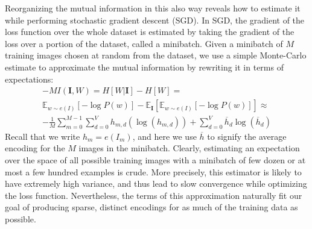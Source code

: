 Reorganizing the mutual information in this also way reveals how to estimate it while performing stochastic gradient descent (SGD). In SGD, the gradient of the loss function over the whole dataset is estimated by taking the gradient of the loss over a portion of the dataset, called a minibatch. Given a minibatch of $M$ training images chosen at random from the dataset, we use a simple Monte-Carlo estimate to approximate the mutual information by rewriting it in terms of expectations:
\begin{equation}
\begin{split}
    -MI\left(\mathbf{I}, W\right) = H[W | \mathbf{I}] - H[W] = \\
    \mathbb{E}_{w \sim e(I)}\left[ -\log P(w) \right] - \mathbb{E}_\mathbf{I}\left[ \mathbb{E}_{w \sim e(I)}\left[ -\log P(w) \right] \right] \approx \\
    -\frac{1}{M} \sum_{m=0}^{M-1} \sum_{d=0}^V h_{m,d} (\log(h_{m,d})) +
            \sum_{d=0}^V \overline{h}_d \log(\overline{h}_d)
    \end{split}
\end{equation}
Recall that we write $h_m = e(I_m)$, and here we use $\overline{h}$ to signify the average encoding for the $M$ images in the minibatch.
Clearly, estimating an expectation over the space of all possible training images with a minibatch of few dozen or at most a few hundred examples is crude. More precisely, this estimator is likely to have extremely high variance, and thus lead to slow convergence while optimizing the loss function. Nevertheless, the terms of this approximation naturally fit our goal of producing sparse, distinct encodings for as much of the training data as possible.

